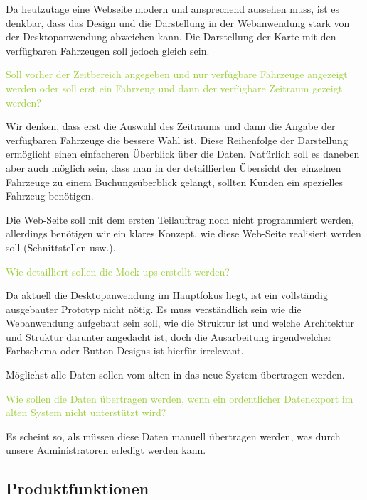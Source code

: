 \begin{itemize}
    \textcolor{NavyBlue}{Da heutzutage eine Webseite modern und ansprechend aussehen muss, ist es denkbar, dass das Design und die Darstellung in der Webanwendung stark von der Desktopanwendung abweichen kann. Die Darstellung der Karte mit den verfügbaren Fahrzeugen soll jedoch gleich sein.}

    \textcolor{YellowGreen}{Soll vorher der Zeitbereich angegeben und nur verfügbare Fahrzeuge angezeigt werden oder soll erst ein Fahrzeug und dann der verfügbare Zeitraum gezeigt werden?}

    \textcolor{NavyBlue}{Wir denken, dass erst die Auswahl des Zeitraums und dann die Angabe der verfügbaren Fahrzeuge die bessere Wahl ist. Diese Reihenfolge der Darstellung ermöglicht einen einfacheren Überblick über die Daten. Natürlich soll es daneben aber auch möglich sein, dass man in der detaillierten Übersicht der einzelnen Fahrzeuge zu einem Buchungsüberblick gelangt, sollten Kunden ein spezielles Fahrzeug benötigen.}
\end{itemize}

Die Web-Seite soll mit dem ersten Teilauftrag noch nicht programmiert werden, allerdings benötigen wir ein klares Konzept, wie diese Web-Seite realisiert werden soll (Schnittstellen usw.).  

\textcolor{YellowGreen}{Wie detailliert sollen die Mock-ups erstellt werden?}

\textcolor{NavyBlue}{Da aktuell die Desktopanwendung im Hauptfokus liegt, ist ein vollständig ausgebauter Prototyp nicht nötig. Es muss verständlich sein wie die Webanwendung aufgebaut sein soll, wie die Struktur ist und welche Architektur und Struktur darunter angedacht ist, doch die Ausarbeitung irgendwelcher Farbschema oder Button-Designs ist hierfür irrelevant.}

Möglichst alle Daten sollen vom alten in das neue System übertragen werden. 

\textcolor{YellowGreen}{Wie sollen die Daten übertragen werden, wenn ein ordentlicher Datenexport im alten System nicht unterstützt wird?}

\textcolor{NavyBlue}{Es scheint so, als müssen diese Daten manuell übertragen werden, was durch unsere Administratoren erledigt werden kann. }
\newpage

\subsection{Produktfunktionen}

